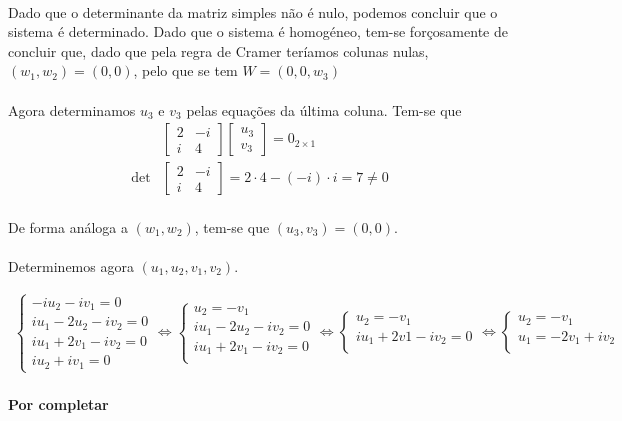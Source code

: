 \paragraph{} Dado que o determinante da matriz simples não é nulo, podemos
concluir que o sistema é determinado. Dado que o sistema é homogéneo, tem-se
forçosamente de concluir que, dado que pela regra de Cramer teríamos colunas
nulas, $(w_1, w_2) = (0, 0)$,
pelo que se tem $W = (0, 0, w_3)$

\paragraph{}Agora determinamos $u_3$ e $v_3$ pelas equações da última coluna.
Tem-se que
\begin{align*}
	&
	\begin{bmatrix*}
		2 & -i\\
		i & 4
	\end{bmatrix*}
	\begin{bmatrix}
		u_3\\
		v_3
	\end{bmatrix}
	=
	0_{2 \times 1}\\
	\det &
	\begin{bmatrix*}
		2 & -i\\
		i & 4
	\end{bmatrix*}
	= 2 \cdot 4 - (-i) \cdot i = 7 \neq 0
\end{align*}

\paragraph{} De forma análoga a $(w_1, w_2)$, tem-se que $(u_3, v_3) = (0, 0)$.

\paragraph{} Determinemos agora $(u_1, u_2, v_1, v_2)$.

\begin{align*}
	\begin{cases}
		- i u_2 - i v_1 = 0\\
		i u_1 - 2 u_2 - i v_2 = 0\\
		i u_1 + 2 v_1 - i v_2 = 0\\
		i u_2 + i v_1 = 0
	\end{cases}
	\iff
	\begin{cases}
		u_2 = - v_1\\
		i u_1 - 2 u_2 - i v_2 = 0\\
		i u_1 + 2 v_1 - i v_2 = 0\\
	\end{cases}
	\iff
	\begin{cases}
		u_2 = - v_1\\
		i u_1 + 2 v1 - i v_2 = 0\\
	\end{cases}
	\iff
	\begin{cases}
		u_2 = - v_1\\
		u_1 = -2v_1 + iv_2\\
	\end{cases}
\end{align*}

\paragraph{Por completar}







